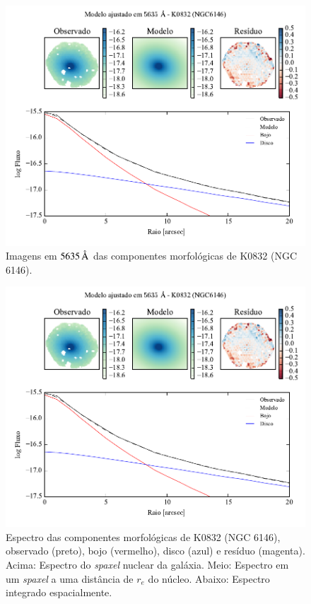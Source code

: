 \begin{figure}
	\includegraphics[page=3]{figuras-decomp/K0832_sample006a}
	\caption[Imagens em $5635\,\angstrom$ das componentes morfológicas de K0832
	(NGC 6146)]
	{Imagens em $5635\,\angstrom$ das componentes morfológicas de K0832
	(NGC 6146).}
	\label{fig:decompImages:K0832}
\end{figure}

\begin{figure}
	\includegraphics[page=4]{figuras-decomp/K0832_sample006a}
	\caption[Espectro das componentes morfológicas de K0832 (NGC 6146)]
	{Espectro das componentes morfológicas de K0832 (NGC 6146),
	observado (preto), bojo (vermelho), disco (azul) e resíduo (magenta). Acima:
	Espectro do {\em spaxel} nuclear da galáxia. Meio: Espectro em um {\em spaxel}
	a uma distância de $r_e$ do núcleo. Abaixo: Espectro integrado espacialmente.}
	\label{fig:decompSpectra:K0832}
\end{figure}

